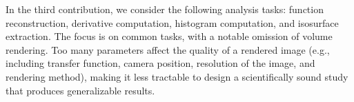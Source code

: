 In the third contribution, we consider the following analysis tasks: function reconstruction,
derivative computation, histogram computation, and isosurface extraction. The focus is on common
tasks, with a notable omission of volume rendering. Too many parameters affect the quality of a
rendered image (e.g., including transfer function, camera position, resolution of the image, and
rendering method), making it less tractable to design a scientifically sound study that produces
generalizable results.

